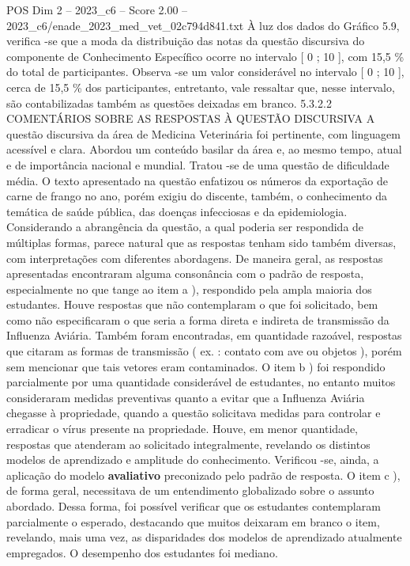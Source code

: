 \begin{textsample}{POS Dim 2 – 2023\_c6 – Score 2.00 – 2023\_c6/enade\_2023\_med\_vet\_02c794d841.txt}
À luz dos dados do Gráfico 5.9, verifica -se que a moda da distribuição das notas da questão discursiva do componente de Conhecimento Específico ocorre no intervalo [ 0 ; 10 ], com 15,5 \% do total de participantes.
Observa -se um valor considerável no intervalo [ 0 ; 10 ], cerca de 15,5 \% dos participantes, entretanto, vale ressaltar que, nesse intervalo, são contabilizadas também as questões deixadas em branco. 5.3.2.2 COMENTÁRIOS SOBRE AS RESPOSTAS À QUESTÃO DISCURSIVA A questão discursiva da área de Medicina Veterinária foi pertinente, com linguagem acessível e clara.
Abordou um conteúdo basilar da área e, ao mesmo tempo, atual e de importância nacional e mundial.
Tratou -se de uma questão de dificuldade média.
O texto apresentado na questão enfatizou os números da exportação de carne de frango no ano, porém exigiu do discente, também, o conhecimento da temática de saúde pública, das doenças infecciosas e da epidemiologia.
Considerando a abrangência da questão, a qual poderia ser respondida de múltiplas formas, parece natural que as respostas tenham sido também diversas, com interpretações com diferentes abordagens.
De maneira geral, as respostas apresentadas encontraram alguma consonância com o padrão de resposta, especialmente no que tange ao item a ), respondido pela ampla maioria dos estudantes.
Houve respostas que não contemplaram o que foi solicitado, bem como não especificaram o que seria a forma direta e indireta de transmissão da Influenza Aviária.
Também foram encontradas, em quantidade razoável, respostas que citaram as formas de transmissão ( ex. : contato com ave ou objetos ), porém sem mencionar que tais vetores eram contaminados.
O item b ) foi respondido parcialmente por uma quantidade considerável de estudantes, no entanto muitos consideraram medidas preventivas quanto a evitar que a Influenza Aviária chegasse à propriedade, quando a questão solicitava medidas para controlar e erradicar o vírus presente na propriedade.
Houve, em menor quantidade, respostas que atenderam ao solicitado integralmente, revelando os distintos modelos de aprendizado e amplitude do conhecimento.
Verificou -se, ainda, a aplicação do modelo \textbf{avaliativo} preconizado pelo padrão de resposta.
O item c ), de forma geral, necessitava de um entendimento globalizado sobre o assunto abordado.
Dessa forma, foi possível verificar que os estudantes contemplaram parcialmente o esperado, destacando que muitos deixaram em branco o item, revelando, mais uma vez, as disparidades dos modelos de aprendizado atualmente empregados.
O desempenho dos estudantes foi mediano.

\end{textsample}
